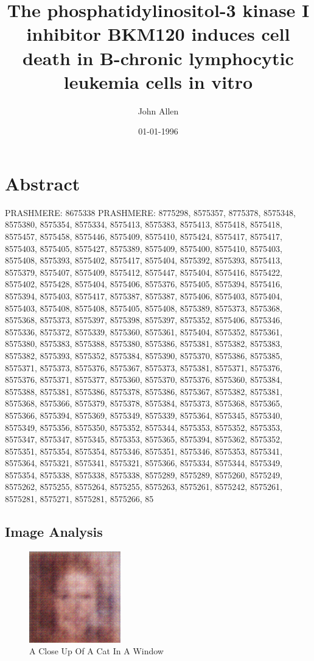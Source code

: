 \documentclass{article}%
\title{The phosphatidylinositol{-}3 kinase I inhibitor BKM120 induces cell death in B{-}chronic lymphocytic leukemia cells in vitro}%
\author{John Allen}%
\affil{Department of Biology, Pamukkale University, Kinikli Campus, 20070 Denizli, Turkey}%
\date{01{-}01{-}1996}%
\begin{document}
%
\normalsize%
\maketitle%
\section{Abstract}%
\label{sec:Abstract}%
PRASHMERE: 8675338\newline%
PRASHMERE: 8775298, 8575357, 8775378, 8575348, 8575380, 8575354, 8575334, 8575413, 8575383, 8575413, 8575418, 8575418, 8575457, 8575458, 8575446, 8575409, 8575410, 8575424, 8575417, 8575417, 8575403, 8575405, 8575427, 8575389, 8575409, 8575400, 8575410, 8575403, 8575408, 8575393, 8575402, 8575417, 8575404, 8575392, 8575393, 8575413, 8575379, 8575407, 8575409, 8575412, 8575447, 8575404, 8575416, 8575422, 8575402, 8575428, 8575404, 8575406, 8575376, 8575405, 8575394, 8575416, 8575394, 8575403, 8575417, 8575387, 8575387, 8575406, 8575403, 8575404, 8575403, 8575408, 8575408, 8575405, 8575408, 8575389, 8575373, 8575368, 8575368, 8575373, 8575397, 8575398, 8575397, 8575352, 8575406, 8575346, 8575336, 8575372, 8575339, 8575360, 8575361, 8575404, 8575352, 8575361, 8575380, 8575383, 8575388, 8575380, 8575386, 8575381, 8575382, 8575383, 8575382, 8575393, 8575352, 8575384, 8575390, 8575370, 8575386, 8575385, 8575371, 8575373, 8575376, 8575367, 8575373, 8575381, 8575371, 8575376, 8575376, 8575371, 8575377, 8575360, 8575370, 8575376, 8575360, 8575384, 8575388, 8575381, 8575386, 8575378, 8575386, 8575367, 8575382, 8575381, 8575368, 8575366, 8575379, 8575378, 8575384, 8575373, 8575368, 8575365, 8575366, 8575394, 8575369, 8575349, 8575339, 8575364, 8575345, 8575340, 8575349, 8575356, 8575350, 8575352, 8575344, 8575353, 8575352, 8575353, 8575347, 8575347, 8575345, 8575353, 8575365, 8575394, 8575362, 8575352, 8575351, 8575354, 8575354, 8575346, 8575351, 8575346, 8575353, 8575341, 8575364, 8575321, 8575341, 8575321, 8575366, 8575334, 8575344, 8575349, 8575354, 8575338, 8575338, 8575338, 8575289, 8575289, 8575260, 8575249, 8575262, 8575255, 8575264, 8575255, 8575263, 8575261, 8575242, 8575261, 8575281, 8575271, 8575281, 8575266, 85

%
\subsection{Image Analysis}%
\label{subsec:ImageAnalysis}%


\begin{figure}[h!]%
\centering%
\includegraphics[width=150px]{500_fake_images/samples_5_144.png}%
\caption{A Close Up Of A Cat In A Window}%
\end{figure}

%
\end{document}
